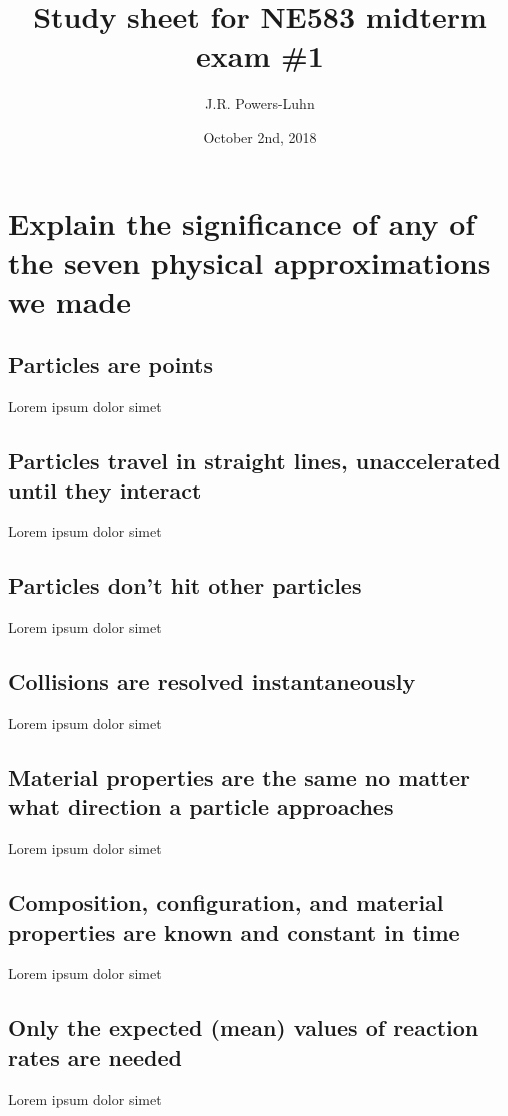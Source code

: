 \documentclass{article}
\title{Study sheet for NE583 midterm exam \#1}
\author{J.R. Powers-Luhn}
\date{October 2nd, 2018}
\begin{document}
\section{Explain the significance of any of the seven physical approximations we made}

\subsection{Particles are points}

Lorem ipsum dolor simet

\subsection{Particles travel in straight lines, unaccelerated until they interact}

Lorem ipsum dolor simet

\subsection{Particles don't hit other particles}

Lorem ipsum dolor simet

\subsection{Collisions are resolved instantaneously}

Lorem ipsum dolor simet

\subsection{Material properties are the same no matter what direction a particle approaches}

Lorem ipsum dolor simet

\subsection{Composition, configuration, and material properties are known and constant in time}

Lorem ipsum dolor simet

\subsection{Only the expected (mean) values of reaction rates are needed}

Lorem ipsum dolor simet
\end{document}
